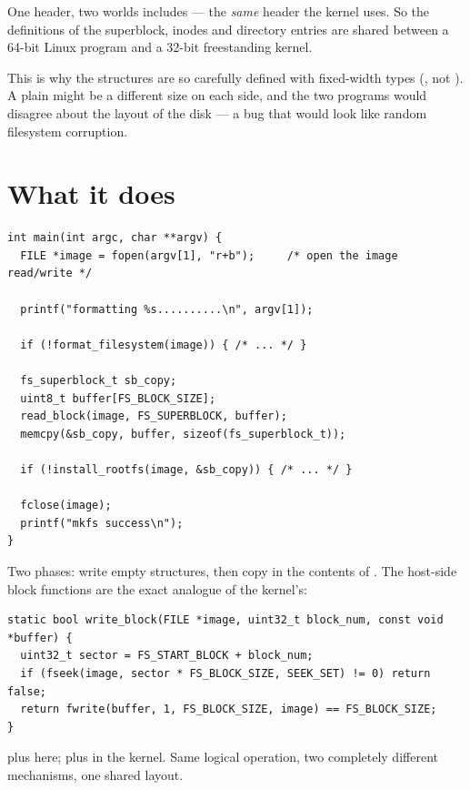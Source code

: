 \begin{concept}{One header, two worlds}
 includes  --- the \emph{same} header the
kernel uses. So the definitions of the superblock, inodes and directory entries are shared between a
64-bit Linux program and a 32-bit freestanding kernel.

This is why the structures are so carefully defined with fixed-width types (, not
). A plain  might be a different size on each side, and the two programs would
disagree about the layout of the disk --- a bug that would look like random filesystem corruption.
\end{concept}

\section{What it does}

\begin{lstlisting}[style=c]
int main(int argc, char **argv) {
  FILE *image = fopen(argv[1], "r+b");     /* open the image read/write */

  printf("formatting %s..........\n", argv[1]);

  if (!format_filesystem(image)) { /* ... */ }

  fs_superblock_t sb_copy;
  uint8_t buffer[FS_BLOCK_SIZE];
  read_block(image, FS_SUPERBLOCK, buffer);
  memcpy(&sb_copy, buffer, sizeof(fs_superblock_t));

  if (!install_rootfs(image, &sb_copy)) { /* ... */ }

  fclose(image);
  printf("mkfs success\n");
}
\end{lstlisting}

Two phases: write empty structures, then copy in the contents of . The
host-side block functions are the exact analogue of the kernel's:

\begin{lstlisting}[style=c]
static bool write_block(FILE *image, uint32_t block_num, const void *buffer) {
  uint32_t sector = FS_START_BLOCK + block_num;
  if (fseek(image, sector * FS_BLOCK_SIZE, SEEK_SET) != 0) return false;
  return fwrite(buffer, 1, FS_BLOCK_SIZE, image) == FS_BLOCK_SIZE;
}
\end{lstlisting}

 plus  here;  plus  in the kernel. Same logical operation,
two completely different mechanisms, one shared layout.


